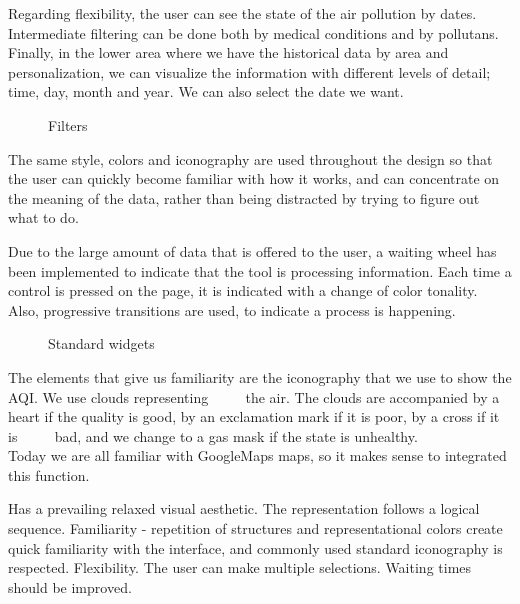 Regarding flexibility, the user can see the state of the air pollution by dates. Intermediate filtering can be done both by medical conditions and by pollutans. Finally, in the lower area where we have
the historical data by area and personalization, we can visualize the information with different levels of detail; time, day, month and year. We can also
select the date we want.
\begin{figure}[ht]
    \centering
    \hfill
    \vfill
  
  \caption{Filters}
    \end{figure}
    The same style, colors and iconography are used throughout the design so that the user can quickly become familiar with how it works, and can
    concentrate on the meaning of the data, rather than being distracted by trying to figure out what to do.
    
    Due to the large amount of data that is offered to the user, a waiting wheel has been implemented to indicate
    that the tool is processing information. Each time a control is pressed on the page, it is indicated with a change
    of color tonality. Also, progressive transitions are used, to indicate a process is happening.

    
    \begin{figure}[ht]
        \centering
        \hfill
        \vfill
         \hfill
      
      \caption{Standard widgets}
        \end{figure}

        The elements that give us familiarity are the iconography that we use to show the AQI. We use clouds representing
             the air. The clouds are accompanied by a heart if the quality is good, by an exclamation mark if it is poor, by a cross if it is
             bad, and we change to a gas mask if the state is unhealthy.
            
             Today we are all familiar with GoogleMaps maps, so it makes sense to integrated this function.      





\begin{itemize}
    \done Has a prevailing relaxed visual aesthetic.
   \done The representation follows a logical sequence.
    \done Familiarity - repetition of structures and representational colors create quick familiarity with the interface, and commonly used standard iconography is respected.
    \done Flexibility. The user can make multiple selections.
    \crossed Waiting times should be improved.
    
\end{itemize}